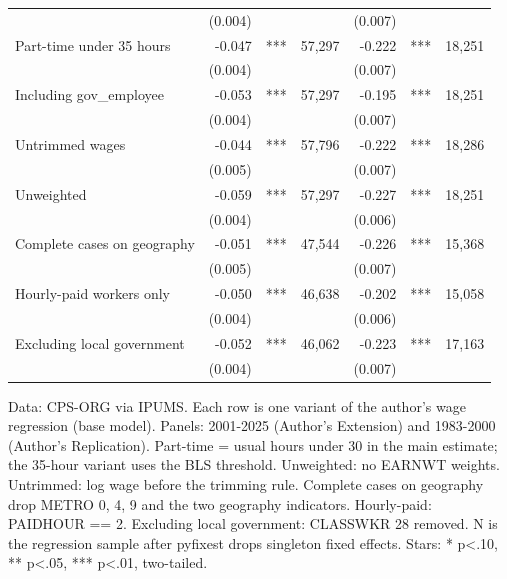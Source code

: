\begin{table}[!t]
\begin{tabular}{l|rlrrlr}
 & (0.004) &  &  & (0.007) &  &  \\
Part-time under 35 hours & -0.047 & *** & 57,297 & -0.222 & *** & 18,251 \\
 & (0.004) &  &  & (0.007) &  &  \\
Including gov\_employee & -0.053 & *** & 57,297 & -0.195 & *** & 18,251 \\
 & (0.004) &  &  & (0.007) &  &  \\
Untrimmed wages & -0.044 & *** & 57,796 & -0.222 & *** & 18,286 \\
 & (0.005) &  &  & (0.007) &  &  \\
Unweighted & -0.059 & *** & 57,297 & -0.227 & *** & 18,251 \\
 & (0.004) &  &  & (0.006) &  &  \\
Complete cases on geography & -0.051 & *** & 47,544 & -0.226 & *** & 15,368 \\
 & (0.005) &  &  & (0.007) &  &  \\
Hourly-paid workers only & -0.050 & *** & 46,638 & -0.202 & *** & 15,058 \\
 & (0.004) &  &  & (0.006) &  &  \\
Excluding local government & -0.052 & *** & 46,062 & -0.223 & *** & 17,163 \\
 & (0.004) &  &  & (0.007) &  &  \\
\bottomrule
\end{tabular}\par\raggedright
\begin{minipage}{\linewidth}
Data: CPS-ORG via IPUMS. Each row is one variant of the author's wage regression (base model). Panels: 2001-2025 (Author's Extension) and 1983-2000 (Author's Replication). Part-time = usual hours under 30 in the main estimate; the 35-hour variant uses the BLS threshold. Unweighted: no EARNWT weights. Untrimmed: log wage before the trimming rule. Complete cases on geography drop METRO 0, 4, 9 and the two geography indicators. Hourly-paid: PAIDHOUR == 2. Excluding local government: CLASSWKR 28 removed. N is the regression sample after pyfixest drops singleton fixed effects. Stars: * p<.10, ** p<.05, *** p<.01, two-tailed.\\
\end{minipage}
\end{table}
